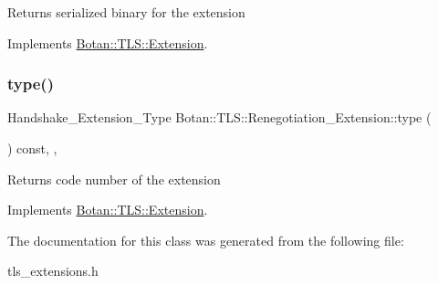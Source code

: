 \begin{DoxyReturn}{Returns}
serialized binary for the extension 
\end{DoxyReturn}


Implements \hyperlink{class_botan_1_1_t_l_s_1_1_extension_a56788726ad2526db54e5a26039cb69db}{Botan\+::\+T\+L\+S\+::\+Extension}.

\mbox{\label{class_botan_1_1_t_l_s_1_1_renegotiation___extension_a68950eaadf339a1c739e044e9fdff665}} 
\subsubsection{\texorpdfstring{type()}{type()}}
{\footnotesize\ttfamily Handshake\+\_\+\+Extension\+\_\+\+Type Botan\+::\+T\+L\+S\+::\+Renegotiation\+\_\+\+Extension\+::type (\begin{DoxyParamCaption}{ }\end{DoxyParamCaption}) const\hspace{0.3cm}{\ttfamily [inline]}, {\ttfamily [override]}, {\ttfamily [virtual]}}

\begin{DoxyReturn}{Returns}
code number of the extension 
\end{DoxyReturn}


Implements \hyperlink{class_botan_1_1_t_l_s_1_1_extension_ac8819b312ce604453225e7b4f7c373ec}{Botan\+::\+T\+L\+S\+::\+Extension}.



The documentation for this class was generated from the following file\+:\begin{DoxyCompactItemize}
\item 
tls\+\_\+extensions.\+h\end{DoxyCompactItemize}
